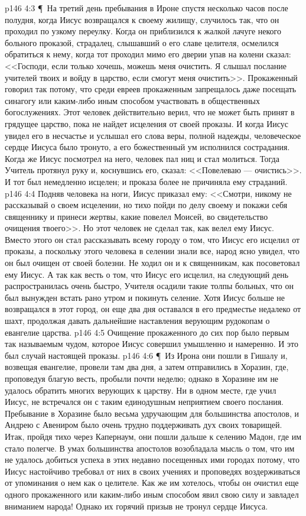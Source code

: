 \vs p146 4:3 \P\ На третий день пребывания в Ироне спустя несколько часов после полудня, когда Иисус возвращался к своему жилищу, случилось так, что он проходил по узкому переулку. Когда он приблизился к жалкой лачуге некого больного проказой, страдалец, слышавший о его славе целителя, осмелился обратиться к нему, когда тот проходил мимо его дверии упав на колени сказал: <<Господи, если только хочешь, можешь меня очистить. Я слышал послание учителей твоих и войду в царство, если смогут меня очистить>>. Прокаженный говорил так потому, что среди евреев прокаженным запрещалось даже посещать синагогу или каким\hyp{}либо иным способом участвовать в общественных богослужениях. Этот человек действительно верил, что не может быть принят в грядущее царство, пока не найдет исцеления от своей проказы. И когда Иисус увидел его в несчастье и услышал его слова веры, полной надежды, человеческое сердце Иисуса было тронуто, а его божественный ум исполнился сострадания. Когда же Иисус посмотрел на него, человек пал ниц и стал молиться. Тогда Учитель протянул руку и, коснувшись его, сказал: <<Повелеваю --- очистись>>. И тот был немедленно исцелен; и проказа более не причиняла ему страданий.
\vs p146 4:4 Подняв человека на ноги, Иисус приказал ему: <<Смотри, никому не рассказывай о своем исцелении, но тихо пойди по делу своему и покажи себя священнику и принеси жертвы, какие повелел Моисей, во свидетельство очищения твоего>>. Но этот человек не сделал так, как велел ему Иисус. Вместо этого он стал рассказывать всему городу о том, что Иисус его исцелил от проказы, а поскольку этого человека в селении знали все, народ ясно увидел, что он был очищен от своей болезни. Не ходил он и к священникам, как посоветовал ему Иисус. А так как весть о том, что Иисус его исцелил, на следующий день распространилась очень быстро, Учителя осадили такие толпы больных, что он был вынужден встать рано утром и покинуть селение. Хотя Иисус больше не возвращался в этот город, он еще два дня оставался в его предместье недалеко от шахт, продолжая давать дальнейшие наставления верующим рудокопам о евангелие царства.
\vs p146 4:5 Очищение прокаженного до сих пор было первым так называемым чудом, которое Иисус совершил умышленно и намеренно. И это был случай настоящей проказы.
\vs p146 4:6 \P\ Из Ирона они пошли в Гишалу и, возвещая евангелие, провели там два дня, а затем отправились в Хоразин, где, проповедуя благую весть, пробыли почти неделю; однако в Хоразине им не удалось обратить многих верующих к царству. Ни в одном месте, где учил Иисус, не встречался он с таким единодушным неприятием своего послания. Пребывание в Хоразине было весьма удручающим для большинства апостолов, и Андрею с Авениром было очень трудно поддерживать дух своих товарищей. Итак, пройдя тихо через Капернаум, они пошли дальше к селению Мадон, где им стало полегче. В умах большинства апостолов возобладала мысль о том, что им не удалось добиться успеха в этих недавно посещенных ими городах потому, что Иисус настойчиво требовал от них в своих учениях и проповедях воздерживаться от упоминания о нем как о целителе. Как же им хотелось, чтобы он очистил еще одного прокаженного или каким\hyp{}либо иным способом явил свою силу и завладел вниманием народа! Однако их горячий призыв не тронул сердце Иисуса.
